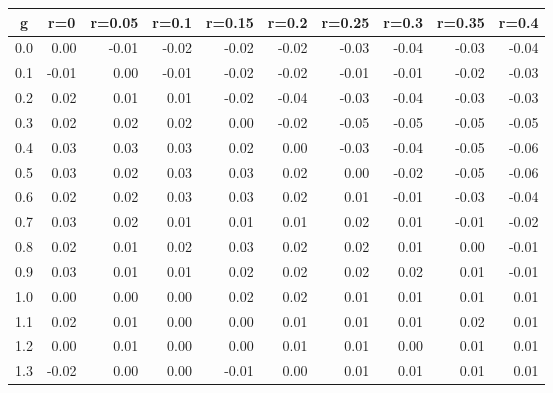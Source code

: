 %
\begin{table}[!tbp]
 \begin{center}
 \begin{tabular}{rrrrrrrrrr}\hline\hline
\multicolumn{1}{c}{g}&\multicolumn{1}{c}{r=0}&\multicolumn{1}{c}{r=0.05}&\multicolumn{1}{c}{r=0.1}&\multicolumn{1}{c}{r=0.15}&\multicolumn{1}{c}{r=0.2}&\multicolumn{1}{c}{r=0.25}&\multicolumn{1}{c}{r=0.3}&\multicolumn{1}{c}{r=0.35}&\multicolumn{1}{c}{r=0.4}\tabularnewline
\hline
0.0& 0.00&-0.01&-0.02&-0.02&-0.02&-0.03&-0.04&-0.03&-0.04\tabularnewline
0.1&-0.01& 0.00&-0.01&-0.02&-0.02&-0.01&-0.01&-0.02&-0.03\tabularnewline
0.2& 0.02& 0.01& 0.01&-0.02&-0.04&-0.03&-0.04&-0.03&-0.03\tabularnewline
0.3& 0.02& 0.02& 0.02& 0.00&-0.02&-0.05&-0.05&-0.05&-0.05\tabularnewline
0.4& 0.03& 0.03& 0.03& 0.02& 0.00&-0.03&-0.04&-0.05&-0.06\tabularnewline
0.5& 0.03& 0.02& 0.03& 0.03& 0.02& 0.00&-0.02&-0.05&-0.06\tabularnewline
0.6& 0.02& 0.02& 0.03& 0.03& 0.02& 0.01&-0.01&-0.03&-0.04\tabularnewline
0.7& 0.03& 0.02& 0.01& 0.01& 0.01& 0.02& 0.01&-0.01&-0.02\tabularnewline
0.8& 0.02& 0.01& 0.02& 0.03& 0.02& 0.02& 0.01& 0.00&-0.01\tabularnewline
0.9& 0.03& 0.01& 0.01& 0.02& 0.02& 0.02& 0.02& 0.01&-0.01\tabularnewline
1.0& 0.00& 0.00& 0.00& 0.02& 0.02& 0.01& 0.01& 0.01& 0.01\tabularnewline
1.1& 0.02& 0.01& 0.00& 0.00& 0.01& 0.01& 0.01& 0.02& 0.01\tabularnewline
1.2& 0.00& 0.01& 0.00& 0.00& 0.01& 0.01& 0.00& 0.01& 0.01\tabularnewline
1.3&-0.02& 0.00& 0.00&-0.01& 0.00& 0.01& 0.01& 0.01& 0.01\tabularnewline
\hline
\end{tabular}

\end{center}

\end{table}

